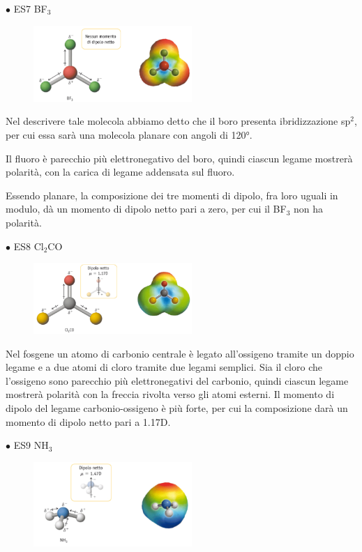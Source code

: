 \vspace{0.2cm}$\bullet$ ES7 BF$_3$

\begin{figure}[htp]
    \centering
    \includegraphics[width=6cm]{immagini/BF_3-dipolo.png}
\end{figure}

Nel descrivere tale molecola abbiamo detto che il boro presenta ibridizzazione sp$^2$, per cui essa sarà una molecola planare con angoli di 120°.

Il fluoro è parecchio più elettronegativo del boro, quindi ciascun legame mostrerà polarità, con la carica di legame addensata sul fluoro.

Essendo planare, la composizione dei tre momenti di dipolo, fra loro uguali in modulo, dà un momento di dipolo netto pari a zero, per cui il BF$_3$ non ha polarità. 

\vspace{0.2cm}$\bullet$ ES8 Cl$_2$CO
\begin{figure}[htp]
    \centering
    \includegraphics[width=6cm]{immagini/Cl_2CO.png}
\end{figure}

\vspace{-0.4cm}Nel fosgene un atomo di carbonio centrale è legato all'ossigeno tramite un doppio legame e a due atomi di cloro tramite due legami semplici. Sia il cloro che l'ossigeno sono parecchio più elettronegativi del carbonio, quindi ciascun legame mostrerà polarità con la freccia rivolta verso gli atomi esterni. Il momento di dipolo del legame carbonio-ossigeno è più forte, per cui la composizione darà un momento di dipolo netto pari a 1.17D.

\vspace{0.2cm}$\bullet$ ES9 NH$_3$

\begin{figure}[htp]
    \centering
    \includegraphics[width=6cm]{immagini/NH_3.png}
\end{figure}

